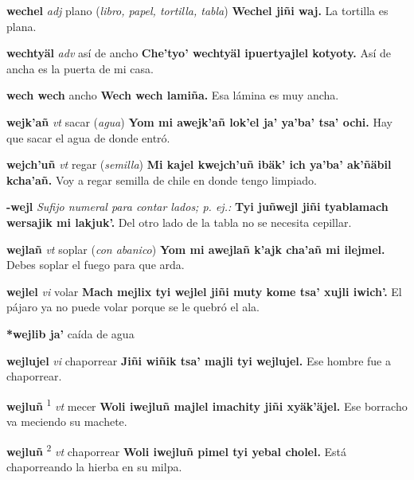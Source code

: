 \documentclass[10pt]{scrbook}
\newcommand{\entry}[1]{\textbf{#1}}
\newcommand{\defsuperscript}[1]{\textsuperscript{#1}}
\newcommand{\nontranslationdef}[1]{\textit{#1}}
\newcommand{\partofspeech}[1]{\textit{#1}}
\newcommand{\spanishtranslation}[1]{#1}
\newcommand{\clarification}[1]{(\textit{#1})}
\newcommand{\cholexample}[1]{\textbf{#1}}
\newcommand{\exampletranslation}[1]{#1}
\begin{document}
\begin{multicols}{2}
\entry{wechel}
\partofspeech{adj}
\spanishtranslation{plano}
\clarification{libro, papel, tortilla, tabla}
\cholexample{Wechel jiñi waj.}
\exampletranslation{La tortilla es plana.}

\entry{wechtyäl}
\partofspeech{adv}
\spanishtranslation{así de ancho}
\cholexample{Che'tyo' wechtyäl ipuertyajlel kotyoty.}
\exampletranslation{Así de ancha es la puerta de mi casa.}

\entry{wech wech}
\spanishtranslation{ancho}
\cholexample{Wech wech lamiña.}
\exampletranslation{Esa lámina es muy ancha.}

\entry{wejk'añ}
\partofspeech{vt}
\spanishtranslation{sacar}
\clarification{agua}
\cholexample{Yom mi awejk'añ lok'el ja' ya'ba' tsa' ochi.}
\exampletranslation{Hay que sacar el agua de donde entró.}

\entry{wejch'uñ}
\partofspeech{vt}
\spanishtranslation{regar}
\clarification{semilla}
\cholexample{Mi kajel kwejch'uñ ibäk' ich ya'ba' ak'ñäbil kcha'añ.}
\exampletranslation{Voy a regar semilla de chile en donde tengo limpiado.}

\entry{-wejl}
\nontranslationdef{Sufijo numeral para contar lados; p. ej.:}
\cholexample{Tyi juñwejl jiñi tyablamach wersajik mi lakjuk'.}
\exampletranslation{Del otro lado de la tabla no se necesita cepillar.}

\entry{wejlañ}
\partofspeech{vt}
\spanishtranslation{soplar}
\clarification{con abanico}
\cholexample{Yom mi awejlañ k'ajk cha'añ mi ilejmel.}
\exampletranslation{Debes soplar el fuego para que arda.}

\entry{wejlel}
\partofspeech{vi}
\spanishtranslation{volar}
\cholexample{Mach mejlix tyi wejlel jiñi muty kome tsa' xujli iwich'.}
\exampletranslation{El pájaro ya no puede volar porque se le quebró el ala.}

\entry{*wejlib ja'}
\spanishtranslation{caída de agua}

\entry{wejlujel}
\partofspeech{vi}
\spanishtranslation{chaporrear}
\cholexample{Jiñi wiñik tsa' majli tyi wejlujel.}
\exampletranslation{Ese hombre fue a chaporrear.}

\entry{wejluñ}
\defsuperscript{1}
\partofspeech{vt}
\spanishtranslation{mecer}
\cholexample{Woli iwejluñ majlel imachity jiñi xyäk'äjel.}
\exampletranslation{Ese borracho va meciendo su machete.}

\entry{wejluñ}
\defsuperscript{2}
\partofspeech{vt}
\spanishtranslation{chaporrear}
\cholexample{Woli iwejluñ pimel tyi yebal cholel.}
\exampletranslation{Está chaporreando la hierba en su milpa.}


\end{multicols}
\end{document}

